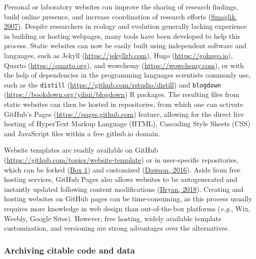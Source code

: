 Personal or laboratory websites can improve the sharing of research findings, build online presence, and increase coordination of research efforts (\protect\hyperlink{ref-HiIPSSHV}{Smaglik, 2007}).
Despite researchers in ecology and evolution generally lacking experience in building or hosting webpages, many tools have been developed to help this process.
Static websites can now be easily built using independent software and languages, such as Jekyll (\url{https://jekyllrb.com}), Hugo (\url{https://gohugo.io}), Quarto (\url{https://quarto.org}), and wowchemy (\url{https://wowchemy.com}), or with the help of dependencies in the programming languages scientists commonly use, such as the \texttt{distill} (\url{https://github.com/rstudio/distill}) and \texttt{blogdown} (\url{https://bookdown.org/yihui/blogdown}) R packages.
The resulting files from static websites can then be hosted in repositories, from which one can activate GitHub's Pages (\url{https://pages.github.com}) feature, allowing for the direct live hosting of HyperText Markup Language (HTML), Cascading Style Sheets (CSS) and JavaScript files within a free github.io domain.

Website templates are readily available on GitHub (\url{https://github.com/topics/website-template}) or in user-specific repositories, which can be forked (\protect\hyperlink{definitions}{Box 1}) and customized (\protect\hyperlink{ref-MXxgZJ45}{Dawson, 2016}).
Aside from free hosting services, GitHub Pages also allows websites to be autogenerated and instantly updated following content modifications (\protect\hyperlink{ref-RVetqmsg}{Bryan, 2018}).
Creating and hosting websites on GitHub pages can be time-consuming, as this process usually requires more knowledge in web design than out-of-the-box platforms (\emph{e.g.}, Wix, Weebly, Google Sites).
However, free hosting, widely available template customization, and versioning are strong advantages over the alternatives.

\hypertarget{archiving-citable-code-and-data}{%
\subsubsection{Archiving citable code and data}\label{archiving-citable-code-and-data}}

